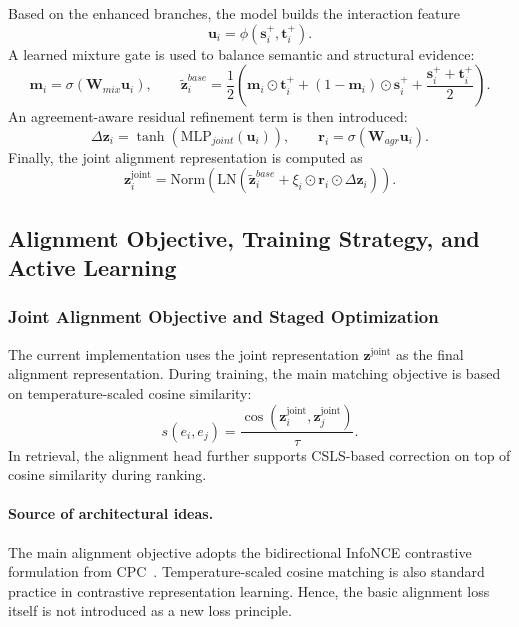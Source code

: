 Based on the enhanced branches, the model builds the interaction feature
\begin{equation}
\mathbf{u}_i
=
\phi(\mathbf{s}_i^{+},\mathbf{t}_i^{+}).
\end{equation}
A learned mixture gate is used to balance semantic and structural evidence:
\begin{equation}
\mathbf{m}_i
=
\sigma(\mathbf{W}_{mix}\mathbf{u}_i),
\qquad
\tilde{\mathbf{z}}_i^{base}
=
\frac{1}{2}
\left(
\mathbf{m}_i\odot\mathbf{t}_i^{+}
+
(1-\mathbf{m}_i)\odot\mathbf{s}_i^{+}
+
\frac{\mathbf{s}_i^{+}+\mathbf{t}_i^{+}}{2}
\right).
\end{equation}
An agreement-aware residual refinement term is then introduced:
\begin{equation}
\Delta \mathbf{z}_i
=
\tanh(\mathrm{MLP}_{joint}(\mathbf{u}_i)),
\qquad
\mathbf{r}_i
=
\sigma(\mathbf{W}_{agr}\mathbf{u}_i).
\end{equation}
Finally, the joint alignment representation is computed as
\begin{equation}
\mathbf{z}_i^{\mathrm{joint}}
=
\mathrm{Norm}
\left(
\mathrm{LN}
\left(
\tilde{\mathbf{z}}_i^{base}
+
\xi_i\odot\mathbf{r}_i\odot\Delta\mathbf{z}_i
\right)
\right).
\end{equation}

\subsection{Alignment Objective, Training Strategy, and Active Learning}

\subsubsection{Joint Alignment Objective and Staged Optimization}

The current implementation uses the joint representation $\mathbf{z}^{\mathrm{joint}}$ as the final alignment representation. During training, the main matching objective is based on temperature-scaled cosine similarity:
\begin{equation}
s(e_i,e_j)
=
\frac{
\cos\!\left(
\mathbf{z}_i^{\mathrm{joint}},
\mathbf{z}_j^{\mathrm{joint}}
\right)
}{\tau}.
\end{equation}
In retrieval, the alignment head further supports CSLS-based correction on top of cosine similarity during ranking.

\paragraph{Source of architectural ideas.}
The main alignment objective adopts the bidirectional InfoNCE contrastive formulation from CPC~\cite{oord2018cpc}. Temperature-scaled cosine matching is also standard practice in contrastive representation learning. Hence, the basic alignment loss itself is not introduced as a new loss principle.

